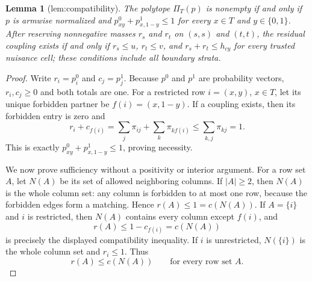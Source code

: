\documentclass{article}
\newtheorem{lemma}{Lemma}
\begin{document}
\begin{lemma}[lem:compatibility]\label{lem:compatibility}
The polytope \(\Pi_T(p)\) is nonempty if and only if \(p\) is armwise normalized and \(p^0_{xy}+p^1_{x,1-y}\leq1\) for every \(x\in T\) and \(y\in\{0,1\}\). After reserving nonnegative masses \(r_s\) and \(r_t\) on \((s,s)\) and \((t,t)\), the residual coupling exists if and only if \(r_s\leq u\), \(r_t\leq v\), and \(r_s+r_t\leq h_{cy}\) for every trusted nuisance cell; these conditions include all boundary strata.
\end{lemma}
\begin{proof}
Write \(r_i=p_i^0\) and \(c_j=p_j^1\).  Because \(p^0\) and \(p^1\) are probability vectors, \(r_i,c_j\ge0\) and both totals are one.  For a restricted row \(i=(x,y)\), \(x\in T\), let its unique forbidden partner be \(f(i)=(x,1-y)\).  If a coupling exists, then its forbidden entry is zero and
\[
 r_i+c_{f(i)}
 =\sum_j\pi_{ij}+\sum_k\pi_{k f(i)}\le \sum_{k,j}\pi_{kj}=1.
\]
This is exactly \(p^0_{xy}+p^1_{x,1-y}\le1\), proving necessity.

We now prove sufficiency without a positivity or interior argument.  For a row set \(A\), let \(N(A)\) be its set of allowed neighboring columns.  If \(|A|\ge2\), then \(N(A)\) is the whole column set: any column is forbidden to at most one row, because the forbidden edges form a matching.  Hence \(r(A)\le1=c(N(A))\).  If \(A=\{i\}\) and \(i\) is restricted, then \(N(A)\) contains every column except \(f(i)\), and
\[
 r(A)\le 1-c_{f(i)}=c(N(A))
\]
is precisely the displayed compatibility inequality.  If \(i\) is unrestricted, \(N(\{i\})\) is the whole column set and \(r_i\le1\).  Thus
\[
 r(A)\le c(N(A))\qquad\text{for every row set }A. \tag{1}
\]


\end{proof}
\end{document}

